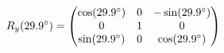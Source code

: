 \documentclass[preview]{standalone}
\begin{document}
\begin{align*}
\special{dvisvgm:raw <g id='unique000'>}R_y(29.9^\circ) = \begin{pmatrix} \cos(29.9^\circ) & 0 & -\sin(29.9^\circ) \\ 0 & 1 & 0 \\ \sin(29.9^\circ) & 0 & \cos(29.9^\circ) \end{pmatrix}\special{dvisvgm:raw </g>}
\end{align*}
\end{document}
